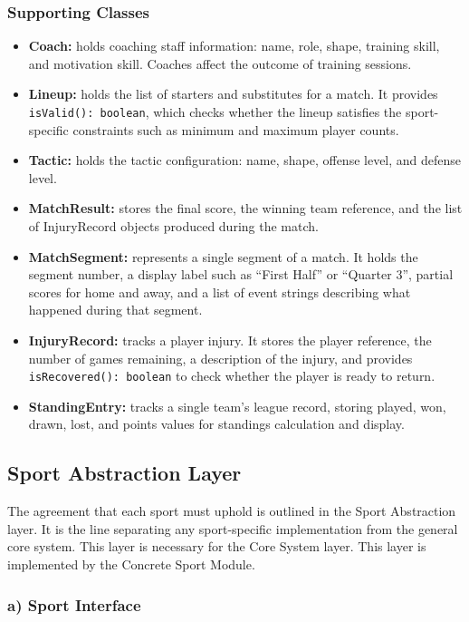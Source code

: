\documentclass[12pt, a4paper]{article}
\begin{document}
\subsubsection*{Supporting Classes}

\begin{itemize}
    \item \textbf{Coach:} holds coaching staff information: name, role, shape, training skill, and motivation skill. Coaches affect the outcome of training sessions.
    \item \textbf{Lineup:} holds the list of starters and substitutes for a match. It provides \texttt{isValid(): boolean}, which checks whether the lineup satisfies the sport-specific constraints such as minimum and maximum player counts.
    \item \textbf{Tactic:} holds the tactic configuration: name, shape, offense level, and defense level.
    \item \textbf{MatchResult:} stores the final score, the winning team reference, and the list of InjuryRecord objects produced during the match.
    \item \textbf{MatchSegment:} represents a single segment of a match. It holds the segment number, a display label such as ``First Half'' or ``Quarter 3'', partial scores for home and away, and a list of event strings describing what happened during that segment.
    \item \textbf{InjuryRecord:} tracks a player injury. It stores the player reference, the number of games remaining, a description of the injury, and provides \texttt{isRecovered(): boolean} to check whether the player is ready to return.
    \item \textbf{StandingEntry:} tracks a single team's league record, storing played, won, drawn, lost, and points values for standings calculation and display.
\end{itemize}

\subsection{Sport Abstraction Layer}

The agreement that each sport must uphold is outlined in the Sport Abstraction layer. It is the
line separating any sport-specific implementation from the general core system. This layer is
necessary for the Core System layer. This layer is implemented by the Concrete Sport
Module.

\subsubsection*{a) Sport Interface}
\end{document}
